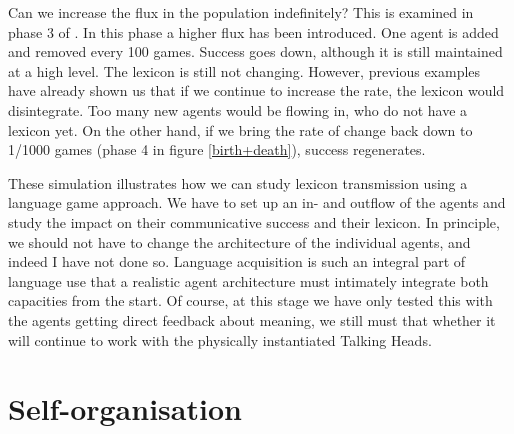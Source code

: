 Can we increase the flux in the population indefinitely? 
This is examined in phase 3 of . 
In this phase a higher flux has been introduced. One agent is added
and removed every 100 games. Success goes down, although it is still maintained at a high 
level. The lexicon is still not changing. 
However, previous examples have already shown us 
that if we continue to increase the rate, the
lexicon would disintegrate. 
Too many new agents would be flowing in, who do not have
a lexicon yet. On the other hand, if we bring the rate of change 
back down to 1/1000 games (phase 4 in figure 
\ref{birth+death}), success regenerates. 

These simulation illustrates how we can study lexicon
transmission using a language game approach. We have
to set up an in- and outflow of the agents and 
study the impact on their communicative success
and their lexicon. In principle, we should 
not have to change the architecture of the individual 
agents, and indeed I have not done so. Language acquisition 
is such an integral part of language use that a realistic 
agent architecture must intimately integrate both capacities
from the start. Of course, at this stage 
we have only tested this
with the agents getting direct feedback about meaning, 
we still must that whether it will continue to work
with the physically instantiated Talking Heads. 

\section{Self-organisation}

